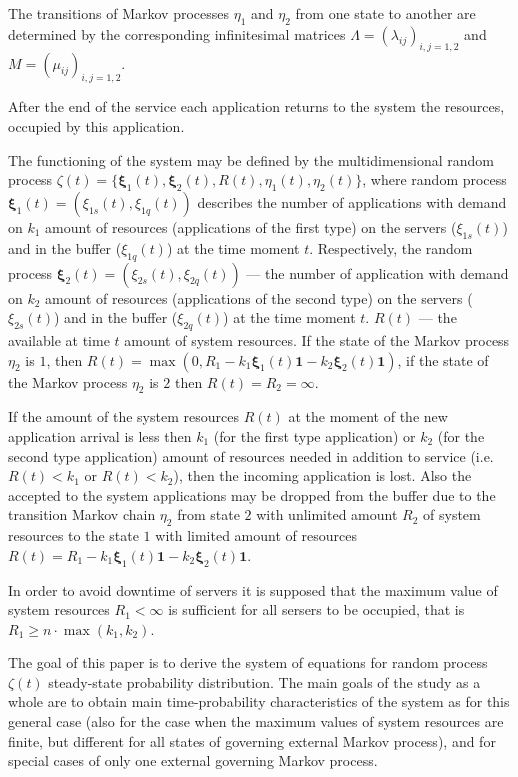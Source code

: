 {The transitions of Markov processes $\eta_1$ and $\eta_2$ from one
state to another are determined by the corresponding infinitesimal
matrices $\Lambda=\left(\lambda_{ij}\right)_{i,j=1,2}$ and
$M=\left(\mu_{ij}\right)_{i,j=1,2}$.

After the end of the service each application returns to the system
the resources, occupied by this application.

The functioning of the system may be defined by the multidimensional
random process
$\zeta(t)=\{\mathbf{\xi}_1 (t), \mathbf{\xi}_2 (t),R(t),\eta_1
(t),\eta_2 (t)\}$, where random process
$\mathbf{\xi}_1 (t)=\left(\xi_{1s}(t),\xi_{1q}(t)\right)$ describes
the number of applications with demand on $k_1$ amount of resources
(applications of the first type) on the servers ($\xi_{1s}(t)$) and in
the buffer ($\xi_{1q}(t)$) at the time moment $t$.  Respectively, the
random process
$\mathbf{\xi}_2 (t)=\left(\xi_{2s}(t),\xi_{2q}(t)\right)$ --- the
number of application with demand on $k_2$ amount of resources
(applications of the second type) on the servers ($\xi_{2s}(t)$) and
in the buffer ($\xi_{2q}(t)$) at the time moment $t$. $R(t)$ --- the
available at time $t$ amount of system resources. If the state of the
Markov process $\eta_2$ is $1$, then
$R(t)=\max(0, R_1 - k_1\mathbf{\xi}_1(t)\mathbf{1} - k_2
\mathbf{\xi}_2 (t)\mathbf{1})$, if the state of the Markov process
$\eta_2$ is $2$ then $R(t)=R_2=\infty$.

If the amount of the system resources $R(t)$ at the moment of the new
application arrival is less then $k_1$ (for the first type
application) or $k_2$ (for the second type application) amount of
resources needed in addition to service (i.e. $R(t)<k_1$ or
$R(t)<k_2$), then the incoming application is lost. Also the accepted
to the system applications may be dropped from the buffer due to the
transition Markov chain $\eta_2$ from state $2$ with unlimited amount
$R_2$ of system resources to the state $1$ with limited amount of
resources
$R(t)=R_1 - k_1\mathbf{\xi}_1(t)\mathbf{1} - k_2 \mathbf{\xi}_2
(t)\mathbf{1}$.

In order to avoid downtime of servers it is supposed that the maximum
value of system resources $R_1<\infty$ is sufficient for all sersers
to be occupied, that is $R_1\geqslant  n\cdot\max(k_1,k_2)$.


The goal of this paper is to derive the system of equations for random
process $\zeta(t)$ steady-state probability distribution. The main
goals of the study as a whole are to obtain main time-probability
characteristics of the system as for this general case (also for the
case when the maximum values of system resources are finite, but
different for all states of governing external Markov process), and
for special cases of only one external governing Markov process.


}
